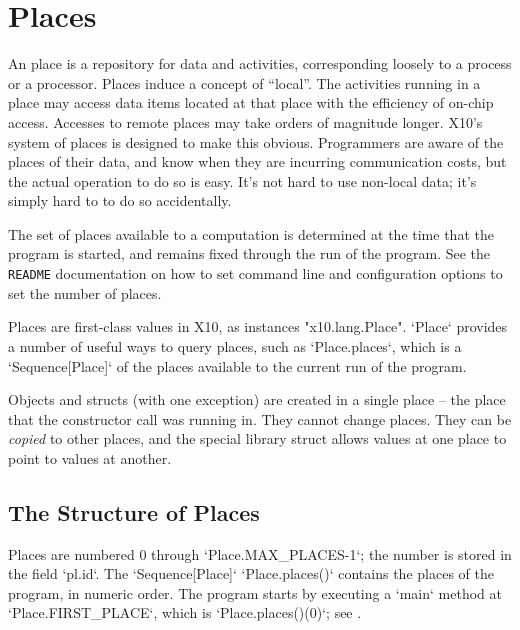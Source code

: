 
\chapter{Places}
\label{XtenPlaces}

An \Xten{} place is a repository for data and activities, corresponding
loosely to a process or a processor. Places induce a concept of ``local''. The
activities running in a place may access data items located at that place with
the efficiency of on-chip access. Accesses to remote places may take orders of
magnitude longer. X10's system of places is designed to make this obvious.
Programmers are aware of the places of their data, and know when they are
incurring communication costs, but the actual operation to do so is easy. It's
not hard to use non-local data; it's simply hard to to do so accidentally.

The set of places available to a computation is determined at the time that
the program is started, and remains fixed through the run of the program. See
the {\tt README} documentation on how to set command line and configuration
options to set the number of places.

Places are first-class values in X10, as instances 
\xcd"x10.lang.Place".   \xcd`Place` provides a number of useful ways to
query places, such as \xcd`Place.places`, which is a  \xcd`Sequence[Place]` of 
the places
available to the current run of the program.

Objects and structs (with one exception) are created in a single place -- the
place that the constructor call was running in. They cannot change places.
They can be {\em copied} to other places, and the special library struct
 allows values at one place to point to values at another.  

\section{The Structure of Places}

Places are numbered 0 through \xcd`Place.MAX_PLACES-1`; the number is stored
in the field 
\xcd`pl.id`.  The \xcd`Sequence[Place]` \xcd`Place.places()` contains the places of the
program, in numeric order. 
The program starts by executing a \xcd`main` method at
\xcd`Place.FIRST_PLACE`, which is 
\xcd`Place.places()(0)`; see
. 

